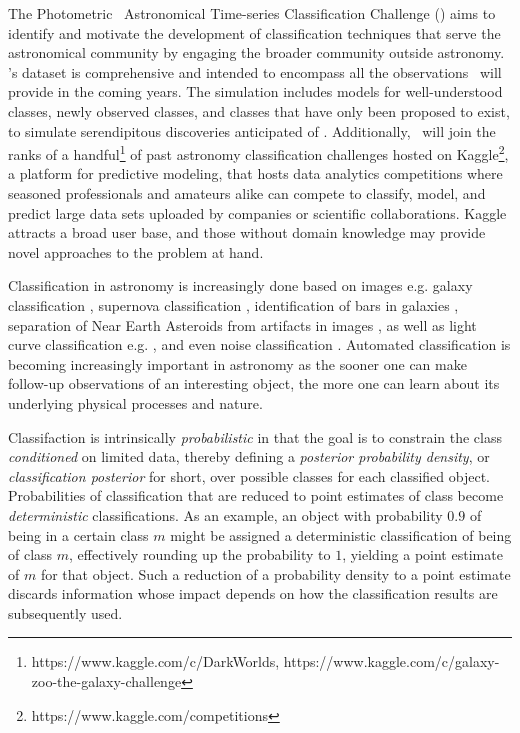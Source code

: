 The Photometric \lsst\ Astronomical Time-series Classification Challenge (\plasticc) aims to identify and motivate the development of classification techniques that serve the astronomical community by engaging the broader community outside astronomy.
\plasticc's dataset is comprehensive and intended to encompass all the observations \lsst\ will provide in the coming years.
The simulation includes models for well-understood classes, newly observed classes, and classes that have only been proposed to exist, to simulate serendipitous discoveries anticipated of \lsst.
Additionally, \plasticc\ will join the ranks of a handful\footnote{https://www.kaggle.com/c/DarkWorlds, https://www.kaggle.com/c/galaxy-zoo-the-galaxy-challenge} of past astronomy classification challenges hosted on Kaggle\footnote{https://www.kaggle.com/competitions}, a platform for predictive modeling, that hosts data analytics competitions where seasoned professionals and amateurs alike can compete to classify, model, and predict large data sets uploaded by companies or scientific collaborations.
Kaggle attracts a broad user base, and those without domain knowledge may provide novel approaches to the problem at hand.

Classification in astronomy is increasingly done based on images e.g. galaxy classification \citep{2016A&C....16...34H}, supernova classification \citep{2017ApJ...836...97C}, identification of bars in galaxies \citep{2018MNRAS.477..894A}, separation of Near Earth Asteroids from artifacts in images \citep{2016PASJ...68..104M}, as well as light curve classification e.g. \citet{2016PASJ...68..104M, 2017arXiv170906257M, 2017CQGra..34f4003Z}, and even noise classification \citet{2017CQGra..34f4003Z, 2018PhRvD..97j1501G}.
Automated classification \cite{2011arXiv1110.4655D, 2012arXiv1209.1681D, 2018ApJS..236....9N,2012PASP..124.1175B} is becoming increasingly important in astronomy as the sooner one can make follow-up observations of an interesting object, the more one can learn about its underlying physical processes and nature.

Classifaction is intrinsically \textit{probabilistic} in that the goal is to constrain the class \textit{conditioned} on limited data, thereby defining a \textit{posterior probability density}, or \textit{classification posterior} for short, over possible classes for each classified object.
Probabilities of classification that are reduced to point estimates of class become \textit{deterministic} classifications.
As an example, an object with probability $0.9$ of being in a certain class $m$ might be assigned a deterministic classification of being of class $m$, effectively rounding up the probability to $1$, yielding a point estimate of $m$ for that object.
Such a reduction of a probability density to a point estimate discards information whose impact depends on how the classification results are subsequently used.

